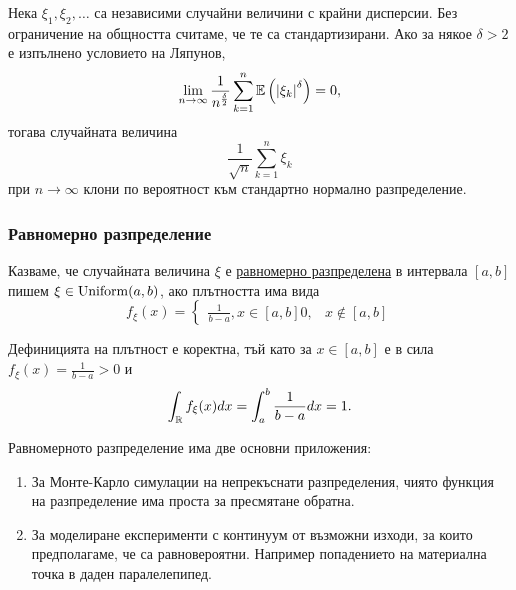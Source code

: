 \documentclass[numbers=endperiod, DIV=15, bibliography=totocnumbered]{scrartcl}
\begin{document}
\begin{theorem}
  Нека $\xi_1, \xi_2, \ldots$ са независими случайни величини с крайни дисперсии. Без ограничение на общността считаме, че те са стандартизирани.
  Ако за някое $\delta > 2$ е изпълнено условието на Ляпунов,
  \begin{displaymath}
    \lim_{n \to \infty} \frac 1 {n^{\frac \delta 2}} \sum_{k=1}^n \mathbb{E} \left( {\left\vert \xi_k \right\vert}^\delta \right) = 0,
  \end{displaymath}
  тогава случайната величина
  \begin{displaymath}
    \frac 1 {\sqrt n} \sum_{k=1}^n \xi_k
  \end{displaymath}
  при $n \to \infty$ клони по вероятност към стандартно нормално разпределение.
\end{theorem}

\subsubsection{Равномерно разпределение}\label{dist:unif}

\begin{definition}
  Казваме, че случайната величина $\xi$ е \uline{равномерно разпределена} в интервала $[a, b]$ пишем $\xi \in \operatorname{Uniform}(a, b)$, ако плътността има вида
  \begin{displaymath}
    f_\xi(x)
    =
    \begin{cases}
      \frac 1 {b-a}, x \in [a, b]
      0, & x \not\in [a, b]
    \end{cases}
  \end{displaymath}

  Дефиницията на плътност е коректна, тъй като за $x \in [a, b]$ е в сила $f_\xi(x) = \frac 1 {b-a} > 0$ и
  \begin{displaymath}
    \int_{\mathbb{R}} f_\xi(x) dx
    =
    \int_a^b \frac 1 {b-a} dx
    =
    1.
  \end{displaymath}
\end{definition}

Равномерното разпределение има две основни приложения:
\begin{enumerate}
  \item За Монте-Карло симулации на непрекъснати разпределения, чиято функция на разпределение има проста за пресмятане обратна.
  \item За моделиране експерименти с континуум от възможни изходи, за които предполагаме, че са равновероятни. Например попадението на материална точка в даден паралелепипед.
\end{enumerate}
\end{document}
